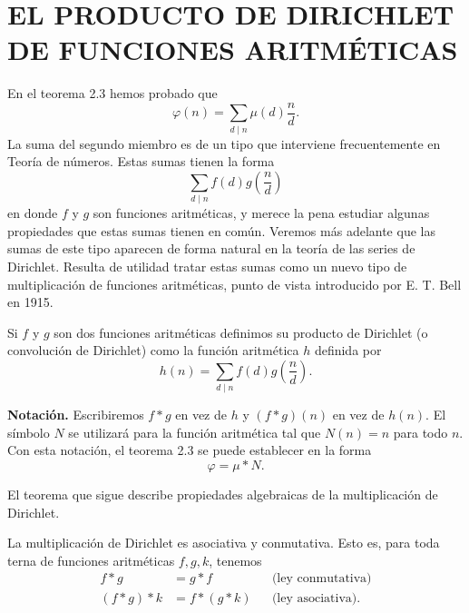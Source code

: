 \documentclass[12pt,a4paper]{book}
\begin{document}
    \section{EL PRODUCTO DE DIRICHLET DE FUNCIONES ARITMÉTICAS}

    En el teorema 2.3 hemos probado que
    \begin{equation*}
        \varphi(n)=\sum_{d\mid n}\mu(d)\frac{n}{d}.
    \end{equation*}
    La suma del segundo miembro es de un tipo que interviene frecuentemente en Teoría de
    números. Estas sumas tienen la forma
    \begin{equation*}
        \sum_{d\mid n}f(d)g\left(\frac{n}{d}\right)
    \end{equation*}
    en donde $f$ y $g$ son funciones aritméticas, y merece la pena estudiar algunas
    propiedades que estas sumas tienen en común. Veremos más adelante que las sumas de este
    tipo aparecen de forma natural en la teoría de las series de Dirichlet. Resulta de
    utilidad tratar estas sumas como un nuevo tipo de multiplicación de funciones
    aritméticas, punto de vista introducido por E. T. Bell en 1915.

    \begin{definicion}
        Si $f$ y $g$ son dos funciones aritméticas definimos su producto de Dirichlet (o
        convolución de Dirichlet) como la función aritmética $h$ definida por
        \begin{equation*}
            h(n)=\sum_{d\mid n}f(d)g\left(\frac{n}{d}\right).
        \end{equation*}
    \end{definicion}

    \textbf{Notación.} Escribiremos $f*g$ en vez de $h$ y $(f*g)(n)$ en vez de $h(n)$. El
    símbolo $N$ se utilizará para la función aritmética tal que $N(n)=n$ para todo $n$. Con
    esta notación, el teorema 2.3 se puede establecer en la forma
    \begin{equation*}
        \varphi=\mu*N.
    \end{equation*}

    El teorema que sigue describe propiedades algebraicas de la multiplicación de
    Dirichlet.

    \begin{teorema}
        La multiplicación de Dirichlet es asociativa y conmutativa. Esto es, para toda
        terna de funciones aritméticas $f,g,k$, tenemos
        \begin{align*}
            f*g&=g*f &&\text{(ley conmutativa)}\\
            (f*g)*k&=f*(g*k) &&\text{(ley asociativa).}
        \end{align*}
    \end{teorema}
\end{document}
